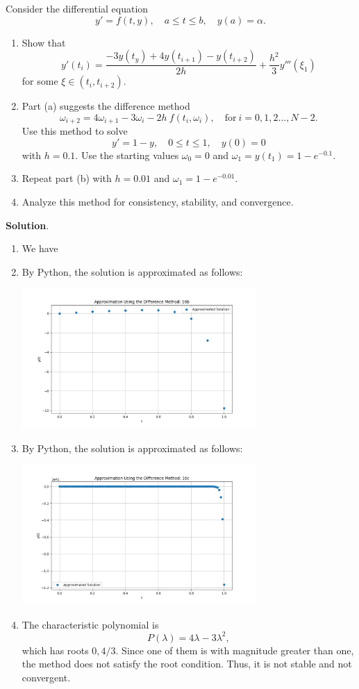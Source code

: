 \documentclass[11pt]{article}
\theoremstyle{break}
\numberwithin{equation}{theorem}
\begin{document}
\newpage
\begin{problem}\label{problem 16} %
    Consider the differential equation $$y'=f(t, y), \quad a\leq t\leq b, \quad y(a)=\alpha.$$
    \begin{enumerate}
        \item Show that $$y'(t_i)=\dfrac{-3y(t_y)+4y(t_{i+1})-y(t_{i+2})}{2h}+\dfrac{h^2}{3}y'''(\xi_1)$$ for some $\xi\in(t_i, t_{i+2})$.
        \item Part (a) suggests the difference method $$\omega_{i+2}=4\omega_{i+1}-3\omega_{i}-2h\:f(t_i, \omega_i), \quad\text{for}\ i=0,1,2\dots, N-2.$$ Use this method to solve $$y'=1-y, \quad 0\leq t\leq 1, \quad y(0)=0$$ with $h=0.1$. Use the starting values $\omega_0=0$ and $\omega_1=y(t_1)=1-e^{-0.1}$.
        \item Repeat part (b) with $h=0.01$ and $\omega_1=1-e^{-0.01}$.
        \item Analyze this method for consistency, stability, and convergence.
    \end{enumerate}
\end{problem}
\textbf{Solution}.
\begin{enumerate}
    \item We have
    \item By Python, the solution is approximated as follows:
    \begin{center}
        \includegraphics[width=0.7\textwidth]{P16b.png}
    \end{center}
    \item By Python, the solution is approximated as follows:
    \begin{center}
        \includegraphics[width=0.7\textwidth]{P16c.png}
    \end{center}
    \item The characteristic polynomial is $$P(\lambda)=4\lambda-3\lambda^2,$$ which has roots $0, 4/3$. Since one of them is with magnitude greater than one, the method does not satisfy the root condition. Thus, it is not stable and not convergent.
\end{enumerate}
\end{document}
